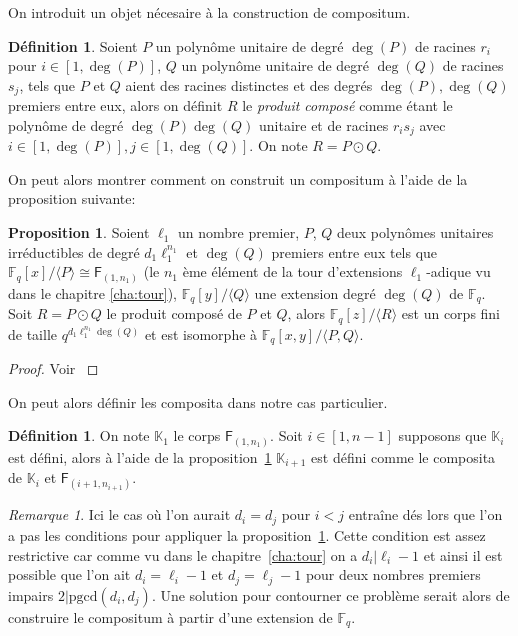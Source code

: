 \documentclass[10pt,a4paper]{book}
\theoremstyle{plain}
\theoremstyle{definition}
\theoremstyle{definition}
\theoremstyle{definition}
\newtheorem{prop}[thm]{Proposition}
\theoremstyle{definition}
\newtheorem{defi}[thm]{Définition}
\theoremstyle{remark}
\newtheorem{rem}[thm]{Remarque}
\theoremstyle{remark}
\theoremstyle{definition}
\begin{document}
On introduit un objet nécesaire à la construction de compositum.
\begin{defi}
Soient $P$ un polynôme unitaire de degré $\deg(P)$ de racines $r_i$ pour 
$i \in [1,\deg(P)]$, $Q$ un polynôme unitaire de degré $\deg(Q)$ de racines 
$s_j$, tels que $P$ et $Q$ aient des racines distinctes et des degrés $\deg(P),
\deg(Q)$ premiers entre eux, alors on définit $R$ le \emph{produit composé} 
comme étant le polynôme de degré $\deg(P)\deg(Q)$ unitaire et de racines 
$r_is_j$ avec $i \in [1,\deg(P)], j \in [1,\deg(Q)]$. On note $R= P\odot Q$.  
\end{defi}
On peut alors montrer comment on construit un compositum à l'aide de la 
proposition suivante: 
\begin{prop}
\label{pro:init:com}
Soient $\ell_1$ un nombre premier, $P$, $Q$ deux 
polynômes unitaires irréductibles de degré $d_1\ell_1^{n_1}$ et $\deg(Q)$ 
premiers entre eux tels que $\mathbb{F}_q[x]/\langle P \rangle \cong 
\mathsf{F}_{(1,n_1)}$ (le $n_1$ ème élément de la tour d'extensions 
$\ell_1$-adique vu dans le chapitre \ref{cha:tour}), $\mathbb{F}_q[y]/\langle Q 
\rangle$ une extension degré $\deg(Q)$ de $\mathbb{F}_q$.
 Soit $R=P\odot Q$  le produit composé de $P$ et $Q$, alors 
 $\mathbb{F}_q[z]/\langle R \rangle$ est un corps fini de taille 
 $q^{d_1\ell_1^{n_1}\deg(Q)}$ et est isomorphe à $\mathbb{F}_q[x,y]/
 \langle P,Q \rangle$.
\end{prop}

\begin{proof}
Voir \cite[Theorem 2]{BrawleyCarlitz87}
\end{proof}


On peut alors définir les composita dans notre cas particulier.
\begin{defi}
\label{def:con:com}
On note $\mathbb{K}_1$ le corps $\mathsf{F}_{(1,n_1)}$. Soit $i \in [1,n-1]$ 
supposons que $\mathbb{K}_{i}$ est défini, alors à 
l'aide de la proposition~\ref{pro:init:com} $\mathbb{K}_{i+1}$ est défini comme
 le composita de $\mathbb{K}_i$ et $\mathsf{F}_{(i+1,n_{i+1})}$.
\end{defi}
\begin{rem}
Ici le cas où l'on aurait $d_i=d_j$ pour $i<j$ entraîne dés lors que l'on a pas
les conditions pour appliquer la proposition~\ref{pro:init:com}. 
Cette condition est assez restrictive car comme vu dans le 
chapitre~\ref{cha:tour} on a $d_i | \ell_i-1$ et ainsi il est possible que l'on
ait $d_i=\ell_i-1$ et $d_j=\ell_j-1$ pour deux nombres premiers impairs 
$2 | \mathrm{pgcd}(d_i,d_j)$. Une solution pour contourner ce problème serait
alors de construire le compositum à partir d'une extension de $\mathbb{F}_q$.
\end{rem}
\end{document}
